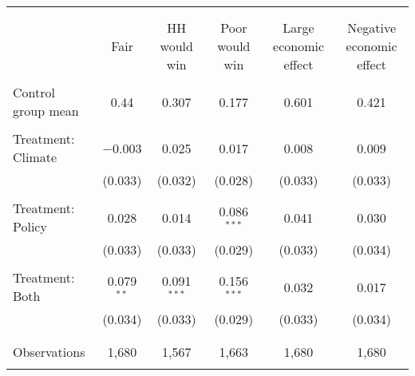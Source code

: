 
\begin{tabular}{@{\extracolsep{5pt}}lccccc} 
\\[-1.8ex]\hline 
\hline \\[-1.8ex] 
\\[-1.8ex] & Fair & HH would win & Poor would win & Large economic effect & Negative economic effect \\ 
\hline \\[-1.8ex] 
 Control group mean & 0.44 & 0.307 & 0.177 & 0.601 & 0.421  \\ \hline \\[-1.8ex] Treatment: Climate & $-$0.003 & 0.025 & 0.017 & 0.008 & 0.009 \\ 
  & (0.033) & (0.032) & (0.028) & (0.033) & (0.033) \\ 
  & & & & & \\ 
 Treatment: Policy & 0.028 & 0.014 & 0.086$^{***}$ & 0.041 & 0.030 \\ 
  & (0.033) & (0.033) & (0.029) & (0.033) & (0.034) \\ 
  & & & & & \\ 
 Treatment: Both & 0.079$^{**}$ & 0.091$^{***}$ & 0.156$^{***}$ & 0.032 & 0.017 \\ 
  & (0.034) & (0.033) & (0.029) & (0.033) & (0.034) \\ 
  & & & & & \\ 
\hline \\[-1.8ex] 

Observations & 1,680 & 1,567 & 1,663 & 1,680 & 1,680 \\ 
\hline 
\hline \\[-1.8ex] 
\end{tabular} 